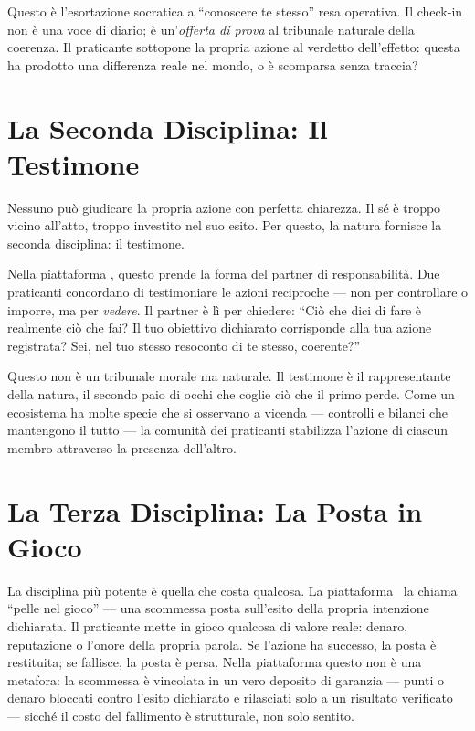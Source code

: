 Questo \`e l'esortazione socratica a ``conoscere te stesso'' resa
operativa. Il check-in non \`e una voce di diario; \`e un'\emph{offerta
di prova} al tribunale naturale della coerenza. Il praticante sottopone
la propria azione al verdetto dell'effetto: questa ha prodotto una
differenza reale nel mondo, o \`e scomparsa senza traccia?

\section{La Seconda Disciplina: Il Testimone}

Nessuno pu\`o giudicare la propria azione con perfetta chiarezza. Il
s\'e \`e troppo vicino all'atto, troppo investito nel suo esito. Per
questo, la natura fornisce la seconda disciplina: il testimone.

Nella piattaforma \praxis, questo prende la forma del partner di
responsabilit\`a. Due praticanti concordano di testimoniare le azioni
reciproche --- non per controllare o imporre, ma per \emph{vedere}. Il
partner \`e l\`i per chiedere: ``Ci\`o che dici di fare \`e realmente
ci\`o che fai? Il tuo obiettivo dichiarato corrisponde alla tua azione
registrata? Sei, nel tuo stesso resoconto di te stesso, coerente?''

Questo non \`e un tribunale morale ma naturale. Il testimone \`e il
rappresentante della natura, il secondo paio di occhi che coglie ci\`o
che il primo perde. Come un ecosistema ha molte specie che si osservano
a vicenda --- controlli e bilanci che mantengono il tutto --- la
comunit\`a dei praticanti stabilizza l'azione di ciascun membro
attraverso la presenza dell'altro.

\section{La Terza Disciplina: La Posta in Gioco}

La disciplina pi\`u potente \`e quella che costa qualcosa. La piattaforma
\praxis\ la chiama ``pelle nel gioco'' --- una scommessa posta sull'esito
della propria intenzione dichiarata. Il praticante mette in gioco qualcosa
di valore reale: denaro, reputazione o l'onore della propria parola. Se
l'azione ha successo, la posta \`e restituita; se fallisce, la posta
\`e persa. Nella piattaforma questo non \`e una metafora: la scommessa \`e
vincolata in un vero deposito di garanzia --- punti o denaro bloccati contro
l'esito dichiarato e rilasciati solo a un risultato verificato --- sicch\'e il
costo del fallimento \`e strutturale, non solo sentito.

